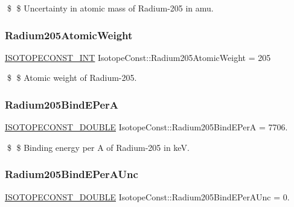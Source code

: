 \$ \$ Uncertainty in atomic mass of Radium-\/205 in amu. \mbox{\label{group___isotope_const-_radium-_ra205_gaeb52f503f21d701251ec1b100e21ffbd}} 
\subsubsection{\texorpdfstring{Radium205\+Atomic\+Weight}{Radium205AtomicWeight}}
{\footnotesize\ttfamily \mbox{\hyperlink{group___isotope_const-_macros_ga5f18360b3e99483a35c32d789e62621c}{I\+S\+O\+T\+O\+P\+E\+C\+O\+N\+S\+T\+\_\+\+I\+NT}} Isotope\+Const\+::\+Radium205\+Atomic\+Weight = 205}

\$ \$ Atomic weight of Radium-\/205. \mbox{\label{group___isotope_const-_radium-_ra205_gac3a84fc9d303f8a393b5c9e604b220d7}} 
\subsubsection{\texorpdfstring{Radium205\+Bind\+E\+PerA}{Radium205BindEPerA}}
{\footnotesize\ttfamily \mbox{\hyperlink{group___isotope_const-_macros_ga8f45a7272ce02c0b4c65c44636ed719a}{I\+S\+O\+T\+O\+P\+E\+C\+O\+N\+S\+T\+\_\+\+D\+O\+U\+B\+LE}} Isotope\+Const\+::\+Radium205\+Bind\+E\+PerA = 7706.}

\$ \$ Binding energy per A of Radium-\/205 in keV. \mbox{\label{group___isotope_const-_radium-_ra205_ga488b7144d6575333eb533508afa6766e}} 
\subsubsection{\texorpdfstring{Radium205\+Bind\+E\+Per\+A\+Unc}{Radium205BindEPerAUnc}}
{\footnotesize\ttfamily \mbox{\hyperlink{group___isotope_const-_macros_ga8f45a7272ce02c0b4c65c44636ed719a}{I\+S\+O\+T\+O\+P\+E\+C\+O\+N\+S\+T\+\_\+\+D\+O\+U\+B\+LE}} Isotope\+Const\+::\+Radium205\+Bind\+E\+Per\+A\+Unc = 0.}

